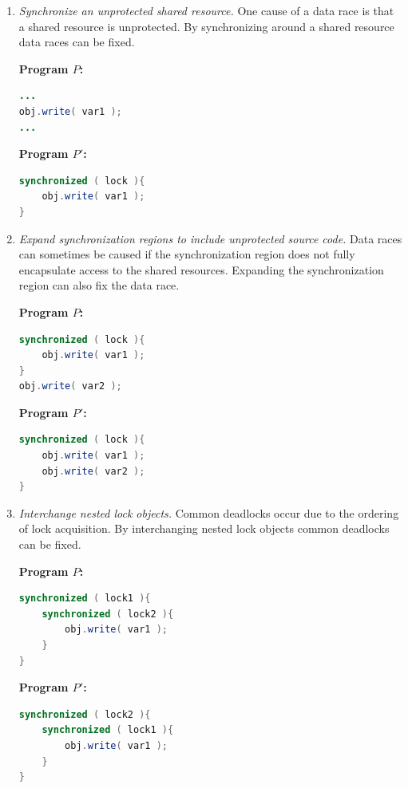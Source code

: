 \documentclass[10pt, conference, compsocconf]{IEEEtran}
\begin{document}
\begin{enumerate}
	\item \textit{Synchronize an unprotected shared resource.} One cause of a data race is that a shared resource is unprotected. By synchronizing around a shared resource data races can be fixed.

\vspace{2mm}
	\begin{minipage}{3.70cm}
	\footnotesize{\textbf{ Program $P$:}}
\begin{lstlisting}[language=Java]
...
obj.write( var1 );
...

\end{lstlisting}
\end{minipage}\hfill
\begin{minipage}{3.70cm}
\footnotesize{\textbf{ Program $P'$:}}
\begin{lstlisting}[language=Java]
synchronized ( lock ){
	obj.write( var1 );
}
\end{lstlisting}
\end{minipage}


	\item \textit{Expand synchronization regions to include unprotected source code.} Data races can sometimes be caused if the synchronization region does not fully encapsulate access to the shared resources. Expanding the synchronization region can also fix the data race.

\vspace{2mm}
	\begin{minipage}{3.70cm}
\footnotesize{\textbf{ Program $P$:}}
\begin{lstlisting}[language=Java]
synchronized ( lock ){
	obj.write( var1 );
}
obj.write( var2 );
\end{lstlisting}
\end{minipage}\hfill
\begin{minipage}{3.70cm}
\footnotesize{\textbf{ Program $P'$:}}
\begin{lstlisting}[language=Java]
synchronized ( lock ){
	obj.write( var1 );
	obj.write( var2 );
}
\end{lstlisting}
\end{minipage}


	\item \textit{Interchange nested lock objects.} Common deadlocks occur due to the ordering of lock acquisition. By interchanging nested lock objects common deadlocks can be fixed.

\vspace{2mm}
	\begin{minipage}{3.70cm}
\footnotesize{\textbf{ Program $P$:}}
\begin{lstlisting}[language=Java]
synchronized ( lock1 ){
	synchronized ( lock2 ){
		obj.write( var1 );
	}
}
\end{lstlisting}
\end{minipage}\hfill
\begin{minipage}{3.70cm}
\footnotesize{\textbf{ Program $P'$:}}
\begin{lstlisting}[language=Java]
synchronized ( lock2 ){
	synchronized ( lock1 ){
		obj.write( var1 );
	}
}
\end{lstlisting}
\end{minipage}


\end{enumerate}
\end{document}
